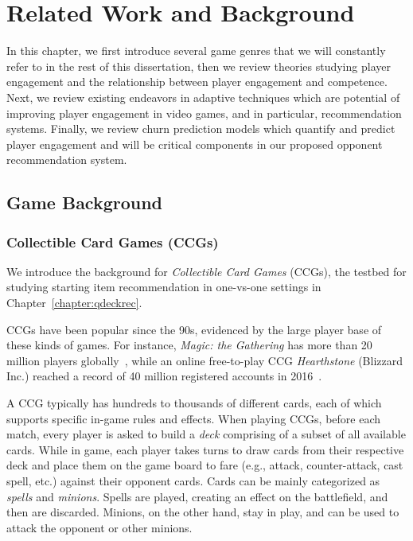 \chapter{Related Work and Background} %

\label{chapter:relatework} 

In this chapter, we first introduce several game genres that we will constantly refer to in the rest of this dissertation, then we review theories studying player engagement and the relationship between player engagement and competence. Next, we review existing endeavors in adaptive techniques which are potential of improving player engagement in video games, and in particular, recommendation systems. Finally, we review churn prediction models which quantify and predict player engagement and will be critical components in our proposed opponent recommendation system.

\section{Game Background}

\subsection{Collectible Card Games (CCGs)}\label{sec:background_ccg}
 We introduce the background for \textit{Collectible Card Games} (CCGs), the testbed for studying starting item recommendation in one-vs-one settings in Chapter~\ref{chapter:qdeckrec}.
 
CCGs have been popular since the 90s, evidenced by the large player base of these kinds of games. For instance, \textit{Magic: the Gathering} has more than 20 million players globally~\cite{guinnessmagic}, while an online free-to-play CCG \textit{Hearthstone} (Blizzard Inc.) reached a record of 40 million registered accounts in 2016~\cite{hearthstonepopular}.  

A CCG typically has hundreds to thousands of different cards, each of which supports specific in-game rules and effects. When playing CCGs, before each match, every player is asked to build a \textit{deck} comprising of a subset of all available cards. While in game, each player takes turns to draw cards from their respective deck and place them on the game board to fare (e.g., attack, counter-attack, cast spell, etc.) against their opponent cards. Cards can be mainly categorized as \textit{spells} and \textit{minions}. Spells are played, creating an effect on the battlefield, and then are discarded. Minions, on the other hand, stay in play, and can be used to attack the opponent or other minions. 

